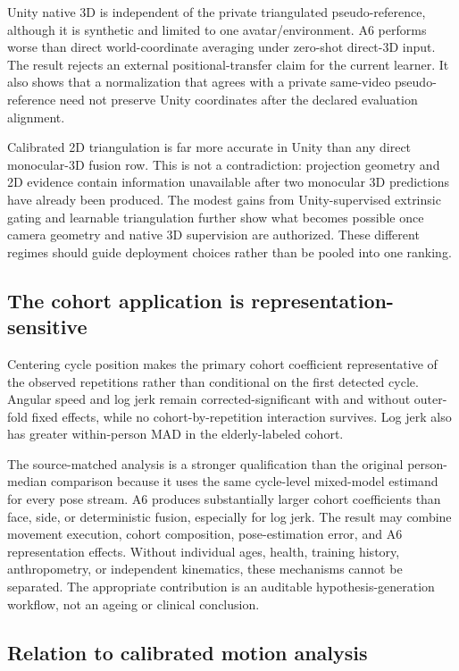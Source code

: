 Unity native 3D is independent of the private triangulated pseudo-reference,
although it is synthetic and limited to one avatar/environment. A6 performs
worse than direct world-coordinate averaging under zero-shot direct-3D input.
The result rejects an external positional-transfer claim for the current
learner. It also shows that a normalization that agrees with a private
same-video pseudo-reference need not preserve Unity coordinates after the
declared evaluation alignment.

Calibrated 2D triangulation is far more accurate in Unity than any direct
monocular-3D fusion row. This is not a contradiction: projection geometry and
2D evidence contain information unavailable after two monocular 3D predictions
have already been produced. The modest gains from Unity-supervised extrinsic
gating and learnable triangulation further show what becomes possible once
camera geometry and native 3D supervision are authorized. These different
regimes should guide deployment choices rather than be pooled into one ranking.

\subsection{The cohort application is representation-sensitive}

Centering cycle position makes the primary cohort coefficient representative of
the observed repetitions rather than conditional on the first detected cycle.
Angular speed and log jerk remain corrected-significant with and without
outer-fold fixed effects, while no cohort-by-repetition interaction survives.
Log jerk also has greater within-person MAD in the elderly-labeled cohort.

The source-matched analysis is a stronger qualification than the original
person-median comparison because it uses the same cycle-level mixed-model
estimand for every pose stream. A6 produces substantially larger cohort
coefficients than face, side, or deterministic fusion, especially for log
jerk. The result may combine movement execution, cohort composition,
pose-estimation error, and A6 representation effects. Without individual ages,
health, training history, anthropometry, or independent kinematics, these
mechanisms cannot be separated. The appropriate contribution is an auditable
hypothesis-generation workflow, not an ageing or clinical conclusion.

\subsection{Relation to calibrated motion analysis}

